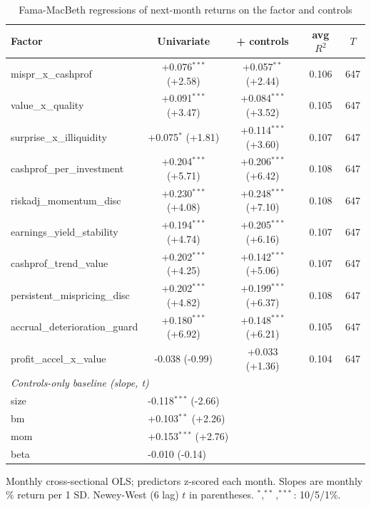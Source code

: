 \begin{table}[htbp]\centering
\caption{Fama-MacBeth regressions of next-month returns on the factor and controls}
\label{tab:fm}
\begin{threeparttable}\footnotesize
\begin{tabular}{lcccc}
\toprule
Factor & Univariate & + controls & avg $R^2$ & $T$ \\
\midrule
mispr\_x\_cashprof & +0.076$^{***}$ (+2.58) & +0.057$^{**}$ (+2.44) & 0.106 & 647 \\
value\_x\_quality & +0.091$^{***}$ (+3.47) & +0.084$^{***}$ (+3.52) & 0.105 & 647 \\
surprise\_x\_illiquidity & +0.075$^{*}$ (+1.81) & +0.114$^{***}$ (+3.60) & 0.107 & 647 \\
cashprof\_per\_investment & +0.204$^{***}$ (+5.71) & +0.206$^{***}$ (+6.42) & 0.108 & 647 \\
riskadj\_momentum\_disc & +0.230$^{***}$ (+4.08) & +0.248$^{***}$ (+7.10) & 0.108 & 647 \\
earnings\_yield\_stability & +0.194$^{***}$ (+4.74) & +0.205$^{***}$ (+6.16) & 0.107 & 647 \\
cashprof\_trend\_value & +0.202$^{***}$ (+4.25) & +0.142$^{***}$ (+5.06) & 0.107 & 647 \\
persistent\_mispricing\_disc & +0.202$^{***}$ (+4.82) & +0.199$^{***}$ (+6.37) & 0.108 & 647 \\
accrual\_deterioration\_guard & +0.180$^{***}$ (+6.92) & +0.148$^{***}$ (+6.21) & 0.105 & 647 \\
profit\_accel\_x\_value & -0.038 (-0.99) & +0.033 (+1.36) & 0.104 & 647 \\
\midrule
\multicolumn{5}{l}{\textit{Controls-only baseline (slope, t)}} \\
size & \multicolumn{2}{l}{-0.118$^{***}$ (-2.66)} & & \\
bm & \multicolumn{2}{l}{+0.103$^{**}$ (+2.26)} & & \\
mom & \multicolumn{2}{l}{+0.153$^{***}$ (+2.76)} & & \\
beta & \multicolumn{2}{l}{-0.010 (-0.14)} & & \\
\bottomrule
\end{tabular}
\begin{tablenotes}\footnotesize
\item Monthly cross-sectional OLS; predictors z-scored each month. Slopes are monthly \% return per 1 SD. Newey-West (6 lag) $t$ in parentheses. $^{*},^{**},^{***}$: 10/5/1\%.
\end{tablenotes}
\end{threeparttable}
\end{table}